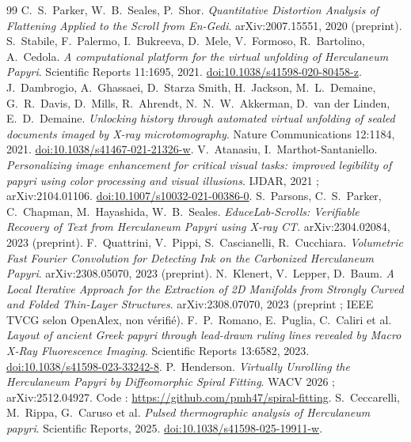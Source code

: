 \documentclass[11pt,a4paper]{article}
\begin{document}
\begin{thebibliography}{99}
 C.~S.~Parker, W.~B.~Seales, P.~Shor. \emph{Quantitative Distortion Analysis of Flattening Applied to the Scroll from En-Gedi}. arXiv:2007.15551, 2020 (preprint).
 S.~Stabile, F.~Palermo, I.~Bukreeva, D.~Mele, V.~Formoso, R.~Bartolino, A.~Cedola. \emph{A computational platform for the virtual unfolding of Herculaneum Papyri}. Scientific Reports 11:1695, 2021. \href{https://doi.org/10.1038/s41598-020-80458-z}{doi:10.1038/s41598-020-80458-z}.
 J.~Dambrogio, A.~Ghassaei, D.~Starza Smith, H.~Jackson, M.~L.~Demaine, G.~R.~Davis, D.~Mills, R.~Ahrendt, N.~N.~W.~Akkerman, D.~van der Linden, E.~D.~Demaine. \emph{Unlocking history through automated virtual unfolding of sealed documents imaged by X-ray microtomography}. Nature Communications 12:1184, 2021. \href{https://doi.org/10.1038/s41467-021-21326-w}{doi:10.1038/s41467-021-21326-w}.
 V.~Atanasiu, I.~Marthot-Santaniello. \emph{Personalizing image enhancement for critical visual tasks: improved legibility of papyri using color processing and visual illusions}. IJDAR, 2021 ; arXiv:2104.01106. \href{https://doi.org/10.1007/s10032-021-00386-0}{doi:10.1007/s10032-021-00386-0}.
 S.~Parsons, C.~S.~Parker, C.~Chapman, M.~Hayashida, W.~B.~Seales. \emph{EduceLab-Scrolls: Verifiable Recovery of Text from Herculaneum Papyri using X-ray CT}. arXiv:2304.02084, 2023 (preprint).
 F.~Quattrini, V.~Pippi, S.~Cascianelli, R.~Cucchiara. \emph{Volumetric Fast Fourier Convolution for Detecting Ink on the Carbonized Herculaneum Papyri}. arXiv:2308.05070, 2023 (preprint).
 N.~Klenert, V.~Lepper, D.~Baum. \emph{A Local Iterative Approach for the Extraction of 2D Manifolds from Strongly Curved and Folded Thin-Layer Structures}. arXiv:2308.07070, 2023 (preprint ; IEEE TVCG selon OpenAlex, non vérifié).
 F.~P.~Romano, E.~Puglia, C.~Caliri et al. \emph{Layout of ancient Greek papyri through lead-drawn ruling lines revealed by Macro X-Ray Fluorescence Imaging}. Scientific Reports 13:6582, 2023. \href{https://doi.org/10.1038/s41598-023-33242-8}{doi:10.1038/s41598-023-33242-8}.
 P.~Henderson. \emph{Virtually Unrolling the Herculaneum Papyri by Diffeomorphic Spiral Fitting}. WACV 2026 ; arXiv:2512.04927. Code : \url{https://github.com/pmh47/spiral-fitting}.
 S.~Ceccarelli, M.~Rippa, G.~Caruso et al. \emph{Pulsed thermographic analysis of Herculaneum papyri}. Scientific Reports, 2025. \href{https://doi.org/10.1038/s41598-025-19911-w}{doi:10.1038/s41598-025-19911-w}.

\end{thebibliography}
\end{document}
